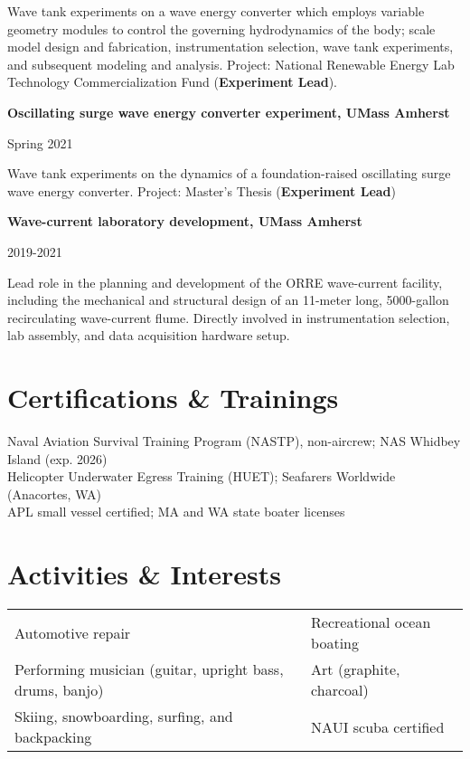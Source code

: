 \documentclass[letterpaper,11pt]{article}
\newenvironment{indentPar}[1]{
  \justifying
  \begin{list}{}{\setlength{\leftmargin}{#1}}%
  \item[]
}
{\end{list}}
\newcommand{\fieldExpEntry}[3]{
  \begin{minipage}[t]{.75\textwidth}
    \begin{flushleft}
      \textbf{#1}
    \end{flushleft}
    \end{minipage}%
    \hfill%
    \begin{minipage}[t]{.23\textwidth}
      \begin{flushright}
        #2%
      \end{flushright}%
    \end{minipage}%
    \vspace{-8pt}%
    \begin{indentPar}{0.5cm}%
      #3%
    \end{indentPar}%
    \vspace{-5pt}%
}
\begin{document}
  {Wave tank experiments on a wave energy converter which employs variable geometry modules to control the governing hydrodynamics of the body; scale model design and fabrication, instrumentation selection, wave tank experiments, and subsequent modeling and analysis. Project: National Renewable Energy Lab Technology Commercialization Fund (\textbf{Experiment Lead}).}
%
\fieldExpEntry
  {Oscillating surge wave energy converter experiment, UMass Amherst}{Spring 2021}
  {Wave tank experiments on the dynamics of a foundation-raised oscillating surge wave energy converter. Project: Master's Thesis  (\textbf{Experiment Lead}) }%
%
\fieldExpEntry{Wave-current laboratory development, UMass Amherst}{2019-2021}{Lead role in the planning and development of the ORRE wave-current facility, including the mechanical and structural design of an 11-meter long, 5000-gallon recirculating wave-current flume. Directly involved in instrumentation selection, lab assembly, and data acquisition hardware setup.}

\section{Certifications \& Trainings}
\vspace{-1pt}
Naval Aviation Survival Training Program (NASTP), non-aircrew; NAS Whidbey Island (exp. 2026)\\
Helicopter Underwater Egress Training (HUET); Seafarers Worldwide (Anacortes, WA)\\
APL small vessel certified; MA and WA state boater licenses
\vspace{-7pt}
\section{Activities \& Interests}
\vspace{-1pt}
\begin{tabular}
  {>{\raggedright\arraybackslash}p{}%
   >{\raggedright\arraybackslash}p{}%
  }
Automotive repair & Recreational ocean boating \\
Performing musician (guitar, upright bass, drums, banjo) & Art (graphite, charcoal)\\
Skiing, snowboarding, surfing, and backpacking & NAUI scuba certified \\
\end{tabular}
\vspace{-7pt}
\end{document}
